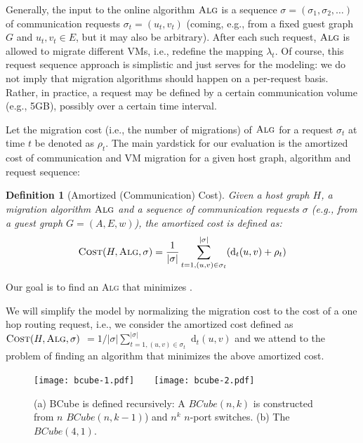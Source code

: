 \documentclass[conference]{IEEEtran}
\newtheorem{definition}{Definition}
\newcommand{\DCost}{\text{\sc Cost}}
\newcommand{\dist}{\text{d}}
\def\BC#1#2{BCube(#1,#2)}
\begin{document}
Generally, the input to the online algorithm $\textsc{Alg}$ is a sequence $\sigma=(\sigma_1, \sigma_2, \dots)$ of communication requests $\sigma_t = (u_t,v_t)$ (coming, e.g., from a fixed guest graph $G$ and $u_t,v_t \in E$, but it may also be arbitrary). After each such request, $\textsc{Alg}$ is allowed to migrate different VMs, i.e., redefine the mapping $\lambda_t$.
Of course, this request sequence approach is simplistic and just serves for the modeling: we do not imply that migration algorithms should happen on a per-request basis. Rather, in practice, a request may be defined by a certain communication volume (e.g., 5GB), possibly over a certain time interval.

Let the migration cost (i.e., the number of migrations) of $\textsc{Alg}$ for a request $\sigma_t$ at time $t$ be denoted as $\rho_{t}$. The main yardstick for our evaluation is the amortized cost of communication and VM migration for a given host graph, algorithm and request sequence:

\begin{definition}[Amortized (Communication) Cost]\label{def:AmortizeCost}
Given a host graph $H$, a migration algorithm $\textsc{Alg}$ and a sequence of communication requests $\sigma$ (e.g., from a guest graph $G=(A,E,w)$), the \emph{amortized cost} is defined as:
\begin{align}
\DCost (H, \textsc{Alg}, \sigma) = \frac{1}{|\sigma|} \sum\limits_{t=1, (u,v)\in \sigma_t}^{|\sigma|} (\dist_{t}(u,v) + \rho_{t})
\end{align}
\end{definition}
Our goal is to find an \textsc{Alg} that minimizes \DCost.

We will simplify the model by normalizing the migration cost to the cost of a one hop routing request, i.e., we consider the amortized cost defined as
$
\DCost (H, \textsc{Alg}, \sigma) $ $= 1/|\sigma| \sum_{t=1, (u,v)\in \sigma_t}^{|\sigma|}$ $\dist_{t}(u,v)
$
and we attend to the problem of finding an algorithm that minimizes the above amortized cost.


\begin{figure}[h]
				\centering
				\texttt{[image: bcube-1.pdf]}~~~~\texttt{[image: bcube-2.pdf]}\\
				\caption{(a) BCube is defined recursively: A $\BC{n}{k}$ is constructed from $n$ $\BC{n}{k-1}$) and $n^k$ $n$-port switches. (b) The $\BC{4}{1}$.}
				\label{fig:bcube}
				\end{figure}
\end{document}
